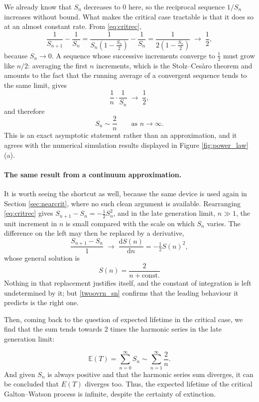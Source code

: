 We already know that $S_n$ decreases to $0$ here, so the reciprocal sequence $1/S_n$ increases without bound. What makes the critical case tractable is that it does so at an almost constant rate. From \eqref{eq:critrec},
\begin{equation}
\frac{1}{S_{n+1}} - \frac{1}{S_n}
=
\frac{1}{S_n\left(1 - \frac{S_n}{2}\right)} - \frac{1}{S_n}
=
\frac{1}{2\left(1 - \frac{S_n}{2}\right)}
\;\longrightarrow\;
\frac{1}{2},
\label{eq:recincrement}
\end{equation}
because $S_n \to 0$. A sequence whose successive increments converge to $\tfrac12$ must grow like $n/2$: averaging the first $n$ increments, which is the Stolz--Ces\`aro theorem and amounts to the fact that the running average of a convergent sequence tends to the same limit, gives
\[
\frac{1}{n}\cdot\frac{1}{S_n} \;\longrightarrow\; \frac{1}{2},
\]
and therefore
\begin{equation}
S_n \sim \frac{2}{n}
\qquad \text{as } n \to \infty. \label{twoovrn_sn}
\end{equation}
This is an exact asymptotic statement rather than an approximation, and it agrees with the numerical simulation results displayed in Figure \ref{fig:power_law}(a).

\paragraph{The same result from a continuum approximation.}
It is worth seeing the shortcut as well, because the same device is used again in Section \ref{sec:nearcrit}, where no such clean argument is available. Rearranging \eqref{eq:critrec} gives $S_{n+1} - S_n = -\tfrac12 S_n^2$, and in the late generation limit, $n \gg 1$, the unit increment in $n$ is small compared with the scale on which $S_n$ varies. The difference on the left may then be replaced by a derivative,
$$\frac{S_{n+1} - S_n}{1} \;\rightarrow\; \frac{\mathrm{d}S(n)}{\mathrm{d} n}  = -\tfrac{1}{2} S(n)^2,$$
whose general solution is
$$S(n) = \frac{2}{n + \text{const.}}$$
Nothing in that replacement justifies itself, and the constant of integration is left undetermined by it; but \eqref{twoovrn_sn} confirms that the leading behaviour it predicts is the right one.

Then, coming back to the question of expected lifetime in the critical case, we find that the sum tends towards 2 times the harmonic series in the late generation limit:

$$\mathbb{E}(T) = \sum_{n=0}^{\infty} S_n \sim \sum_{n=1}^{\infty} \frac{2}{n}.$$
And given $S_n$ is always positive and that the harmonic series sum diverges, it can be concluded that $E(T)$ diverges too. Thus, the expected lifetime of the critical Galton--Watson process is infinite, despite the certainty of extinction.


